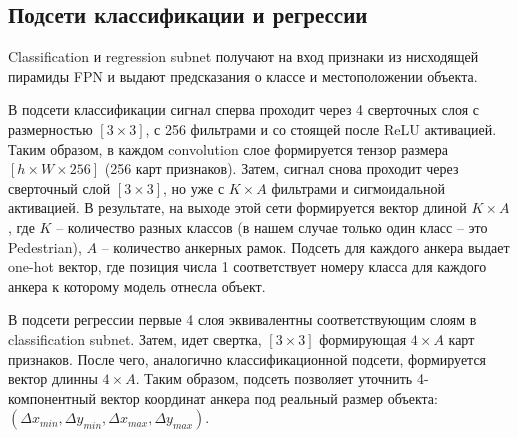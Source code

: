 \subsection{Подсети классификации и регрессии}

Classification и regression subnet получают на вход признаки из нисходящей пирамиды FPN и выдают предсказания о классе и местоположении объекта. 

В подсети классификации сигнал сперва проходит через 4 сверточных слоя с размерностью $[3 \times 3]$, с 256 фильтрами и со стоящей после ReLU активацией. Таким образом, в каждом convolution слое формируется тензор размера $[h \times W \times 256]$ (256 карт признаков). Затем, сигнал снова проходит через сверточный слой $[3 \times 3]$, но уже с $K \times A$ фильтрами и сигмоидальной активацией. В результате, на выходе этой сети формируется вектор длиной $K \times A$, где $K$ -- количество разных классов (в нашем случае только один класс -- это Pedestrian), $A$ -- количество анкерных рамок. Подсеть для каждого анкера выдает one-hot вектор, где позиция числа 1 соответствует номеру класса для каждого анкера к которому модель отнесла объект.

В подсети регрессии первые 4 слоя эквивалентны соответствующим слоям в classification subnet. Затем, идет свертка,  $[3 \times 3]$ формирующая $4 \times A$ карт признаков. После чего, аналогично классификационной подсети, формируется вектор длинны $4 \times A$. Таким образом, подсеть позволяет уточнить 4-компонентный вектор координат анкера под реальный размер объекта: $(\Delta x_{min}, \Delta y_{min}, \Delta x_{max}, \Delta y_{max})$.